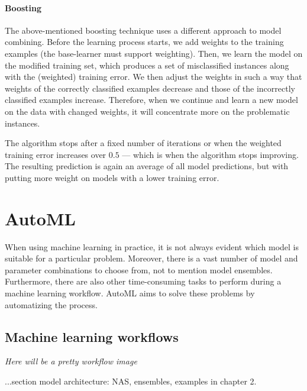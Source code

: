 \paragraph{Boosting} \label{boosting}
The above-mentioned boosting technique uses a different approach to model
combining. Before the learning process starts, we add weights to the training 
examples (the base-learner must support weighting). Then, we learn the model
on the modified training set, which produces a set of misclassified instances
along with the (weighted) training error. We then adjust the weights in such a
way that weights of the correctly classified examples decrease and those of
the incorrectly classified examples increase. Therefore, when we continue and
learn a new model on the data with changed weights, it will concentrate more 
on the problematic instances.

The algorithm stops after a fixed number of iterations or when the weighted
training error increases over $0.5$ --- which is when the algorithm stops
improving. The resulting prediction is again an average of all model
predictions, but with putting more weight on models with a lower training
error. \citep[335]{Flach:2012:MLA:2490546}

\section{AutoML}
When using machine learning in practice, it is not always evident which model
is suitable for a particular problem. Moreover, there is a vast number of model
and parameter combinations to choose from, not to mention model ensembles.
Furthermore, there are also other time-consuming tasks to perform during
a machine learning workflow. AutoML aims to solve these problems by
automatizing the process.


\subsection{Machine learning workflows}
\textit{Here will be a pretty workflow image} %


...section model architecture: NAS, ensembles, examples in chapter 2.



